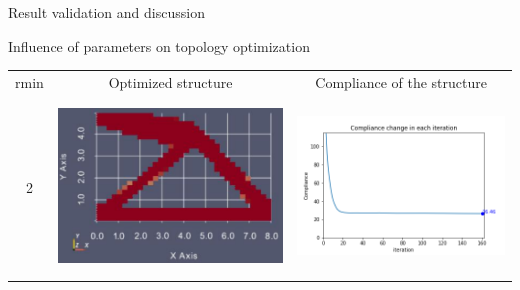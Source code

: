 \documentclass[a4paper,12pt,times]{article}
\begin{document}
\begin{section}{Result validation and discussion}
\begin{subsection}{Influence of parameters on topology optimization}
\begin{enumerate}
\end{enumerate}
\begin{center} 
\begin{table} [H]
\begin{tabular}{c|c|c} 
rmin & Optimized structure& Compliance of the structure\\ 
\\\hline\\
2&\includegraphics[scale = 0.5]{rmin_2.png} & \includegraphics[scale = 0.4]{MMA_ComplianceVSiteration_rmin_2.png}\\ 
\\\hline\\ 

\end{tabular}
\end{table}
\end{center}
\end{subsection}
\end{section}
\end{document}
